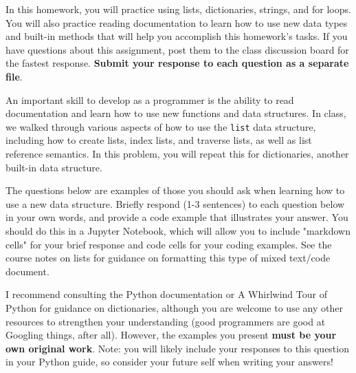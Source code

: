 \documentclass{homework}
\begin{document}
\maketitle

In this homework, you will practice using lists, dictionaries, strings, and for loops. You will also practice reading documentation to learn how to use new data types and built-in methods that will help you accomplish this homework's tasks. If you have questions about this assignment, post them to the class discussion board for the fastest response. \textbf{Submit your response to each question as a separate file}.


An important skill to develop as a programmer is the ability to read documentation and learn how to use new functions and data structures. In class, we walked through various aspects of how to use the \texttt{list} data structure, including how to create lists, index lists, and traverse lists, as well as list reference semantics. In this problem, you will repeat this for dictionaries, another built-in data structure.

The questions below are examples of those you should ask when learning how to use a new data structure. Briefly respond (1-3 sentences) to each question below in your own words, and provide a code example that illustrates your answer. You should do this in a Jupyter Notebook, which will allow you to include "markdown cells" for your brief response and code cells for your coding examples. See the course notes on lists for guidance on formatting this type of mixed text/code document.

I recommend consulting the Python documentation or A Whirlwind Tour of Python for guidance on dictionaries, although you are welcome to use any other resources to strengthen your understanding (good programmers are good at Googling things, after all). However, the examples you present \textbf{must be your own original work}. Note: you will likely include your responses to this question in your Python guide, so consider your future self when writing your answers!
\end{document}
